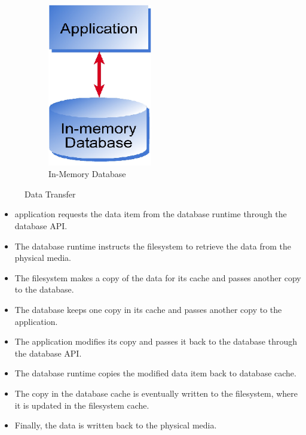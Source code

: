 \documentclass[12pt]{article} %
\begin{document}
\begin{figure}
\begin{subfigure}[b]{0.3\textwidth}
		\includegraphics[width=0.5\textwidth]{./pictures/fig4}
		\caption{In-Memory Database}
		\label{fig:fig3b}
	\end{subfigure}
	\caption{Data Transfer}\label{fig:fig3}
\end{figure}

\begin{itemize}
\item application requests the data item from the database runtime through the database API.

\item The database runtime instructs the filesystem to retrieve the data from the physical media.

\item The filesystem makes a copy of the data for its cache and passes another copy to the database.

\item The database keeps one copy in its cache and passes another copy to the application.

\item The application modifies its copy and passes it back to the database through the database API.

\item The database runtime copies the modified data item back to database cache.

\item The copy in the database cache is eventually written to the filesystem, where it is updated in the filesystem cache.

\item Finally, the data is written back to the physical media.
\end{itemize}
\end{document}
